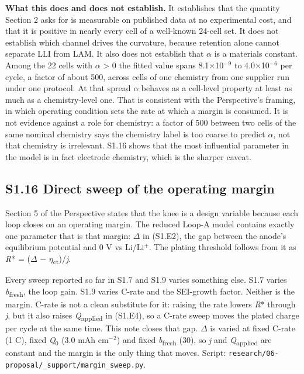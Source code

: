 \documentclass[11pt,a4paper]{article}
\begin{document}
\textbf{What this does and does not establish.} It establishes that the quantity Section 2 asks for is measurable on published data at no experimental cost, and that it is positive in nearly every cell of a well-known 24-cell set. It does not establish which channel drives the curvature, because retention alone cannot separate LLI from LAM. It also does not establish that \ensuremath{\alpha} is a materials constant. Among the 22 cells with \ensuremath{\alpha} > 0 the fitted value spans 8.1\ensuremath{\times}10\ensuremath{^{-}}\ensuremath{^{9}} to 4.0\ensuremath{\times}10\ensuremath{^{-}}\ensuremath{^{6}} per cycle, a factor of about 500, across cells of one chemistry from one supplier run under one protocol. At that spread \ensuremath{\alpha} behaves as a cell-level property at least as much as a chemistry-level one. That is consistent with the Perspective's framing, in which operating condition sets the rate at which a margin is consumed. It is not evidence against a role for chemistry: a factor of 500 between two cells of the same nominal chemistry says the chemistry label is too coarse to predict \ensuremath{\alpha}, not that chemistry is irrelevant. S1.16 shows that the most influential parameter in the model is in fact electrode chemistry, which is the sharper caveat.


\subsection*{S1.16 Direct sweep of the operating margin}


Section 5 of the Perspective states that the knee is a design variable because each loop closes on an operating margin. The reduced Loop-A model contains exactly one parameter that is that margin: \ensuremath{\Delta} in (S1.E2), the gap between the anode's equilibrium potential and 0 V vs Li/Li\ensuremath{^{+}}. The plating threshold follows from it as \emph{R}* = (\ensuremath{\Delta} \ensuremath{-} \ensuremath{\eta}\textsubscript{ct})/\emph{j}.


Every sweep reported so far in S1.7 and S1.9 varies something else. S1.7 varies \emph{b}\textsubscript{fresh}, the loop gain. S1.9 varies C-rate and the SEI-growth factor. Neither is the margin. C-rate is not a clean substitute for it: raising the rate lowers \emph{R}* through \emph{j}, but it also raises \emph{Q}\textsubscript{applied} in (S1.E4), so a C-rate sweep moves the plated charge per cycle at the same time. This note closes that gap. \ensuremath{\Delta} is varied at fixed C-rate (1 C), fixed \emph{Q}\ensuremath{_{0}} (3.0 mAh cm\ensuremath{^{-}}\ensuremath{^{2}}) and fixed \emph{b}\textsubscript{fresh} (30), so \emph{j} and \emph{Q}\textsubscript{applied} are constant and the margin is the only thing that moves. Script: \texttt{research/06-}\hspace{0pt}\texttt{proposal/\_}\hspace{0pt}\texttt{support/}\hspace{0pt}\texttt{margin\_sweep.}\hspace{0pt}\texttt{py}.
\end{document}
